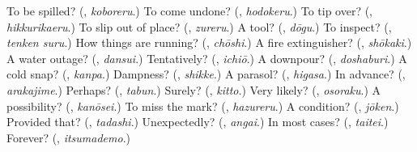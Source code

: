 \begin{tcolorbox}[breakable,colback=teal!4,colframe=teal!35!black,title={Before you move on}]
To be spilled? (\textbf{}, \emph{koboreru}.) To come undone? (\textbf{}, \emph{hodokeru}.) To tip over? (\textbf{}, \emph{hikkurikaeru}.) To slip out of place? (\textbf{}, \emph{zureru}.) A tool? (\textbf{}, \emph{dōgu}.) To inspect? (\textbf{}, \emph{tenken suru}.) How things are running? (\textbf{}, \emph{chōshi}.) A fire extinguisher? (\textbf{}, \emph{shōkaki}.) A water outage? (\textbf{}, \emph{dansui}.) Tentatively? (\textbf{}, \emph{ichiō}.) A downpour? (\textbf{}, \emph{doshaburi}.) A cold snap? (\textbf{}, \emph{kanpa}.) Dampness? (\textbf{}, \emph{shikke}.) A parasol? (\textbf{}, \emph{higasa}.) In advance? (\textbf{}, \emph{arakajime}.) Perhaps? (\textbf{}, \emph{tabun}.) Surely? (\textbf{}, \emph{kitto}.) Very likely? (\textbf{}, \emph{osoraku}.) A possibility? (\textbf{}, \emph{kanōsei}.) To miss the mark? (\textbf{}, \emph{hazureru}.) A condition? (\textbf{}, \emph{jōken}.) Provided that? (\textbf{}, \emph{tadashi}.) Unexpectedly? (\textbf{}, \emph{angai}.) In most cases? (\textbf{}, \emph{taitei}.) Forever? (\textbf{}, \emph{itsumademo}.)
\end{tcolorbox}
